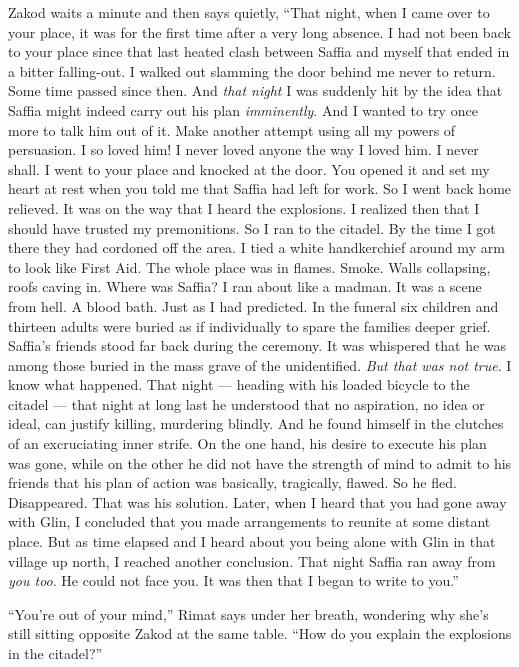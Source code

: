 \documentclass[twoside,11pt,openany]{book}
\begin{document}
Zakod waits a minute and then says quietly, ``That night, when I came over to your
place,{ }it was for the first time after a very long absence. I had not been
back{ }to your place since that last heated clash between Saffia and myself
that ended in a bitter falling-out. I walked out slamming the door behind me never to return.  Some time passed since
then. And \textit{that night} I was suddenly hit by the idea that Saffia might indeed carry out his plan
\textit{imminently}. And I wanted to try once more to talk him out of it. Make another attempt using all my powers of
persuasion. I so loved him! I never loved anyone the way I loved him. I never shall. I went to your place and knocked
at the door. You opened it and set my heart at rest when you told me that Saffia had left for work. So I went back
home relieved.  It was on the way that I heard the explosions. I realized then that I should have trusted my
premonitions. So I ran to the citadel. By the time I got there they had cordoned off the area. I tied a white
handkerchief around my arm to look like First Aid. The whole place was in flames. Smoke. Walls collapsing, roofs caving
in. Where was Saffia? I ran about like a madman. It was a scene from hell. A blood bath. Just as I had predicted. In
the funeral six children and thirteen adults were buried as if individually to spare the families deeper grief.
Saffia's friends stood far back during the ceremony. It was whispered that he was among those buried in the mass grave
of the unidentified. \textit{But that was not true}. I know what happened. That night --- heading with his loaded
bicycle to the citadel --- that night at long last he understood that no aspiration, no idea or ideal, can justify
killing, murdering blindly. And he found himself in the clutches of an excruciating inner strife. On the one hand, his
desire to execute his plan was gone, while on the other he did not have the strength of mind to admit to his friends
that his plan of action was basically, tragically, flawed. So he fled. Disappeared. That was his solution. Later, when
I heard that you had gone away with Glin, I concluded that you made arrangements to reunite at some distant place. But
as time elapsed and I heard about you being alone with Glin in that village up north, I reached another conclusion.
That night Saffia ran away from\textit{ you too}. He could not face you. It was then that I began to write to
you.''

``You're out of your mind,'' Rimat says under her breath, wondering why she's still sitting
opposite Zakod at the same table. ``How do you explain the explosions in the citadel?''
\end{document}
